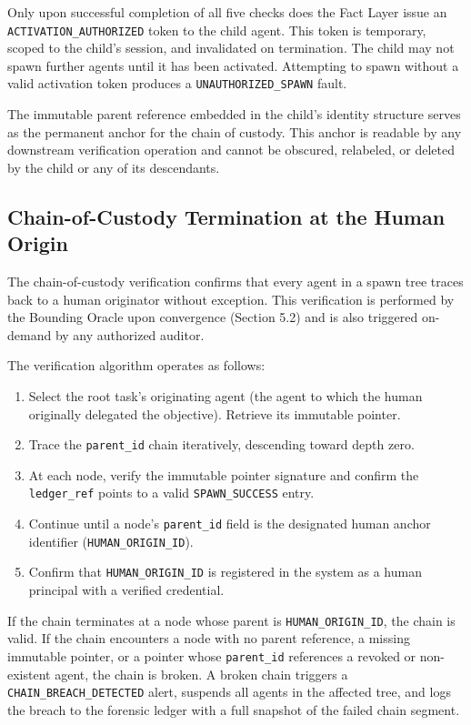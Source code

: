 Only upon successful completion of all five checks does the Fact Layer issue an \texttt{ACTIVATION\_AUTHORIZED} token to the child agent. This token is temporary, scoped to the child's session, and invalidated on termination. The child may not spawn further agents until it has been activated. Attempting to spawn without a valid activation token produces a \texttt{UNAUTHORIZED\_SPAWN} fault.

The immutable parent reference embedded in the child's identity structure serves as the permanent anchor for the chain of custody. This anchor is readable by any downstream verification operation and cannot be obscured, relabeled, or deleted by the child or any of its descendants.

\subsection{Chain-of-Custody Termination at the Human Origin}

The chain-of-custody verification confirms that every agent in a spawn tree traces back to a human originator without exception. This verification is performed by the Bounding Oracle upon convergence (Section 5.2) and is also triggered on-demand by any authorized auditor.

The verification algorithm operates as follows:

\begin{enumerate}
    \item Select the root task's originating agent (the agent to which the human originally delegated the objective). Retrieve its immutable pointer.
    \item Trace the \texttt{parent\_id} chain iteratively, descending toward depth zero.
    \item At each node, verify the immutable pointer signature and confirm the \texttt{ledger\_ref} points to a valid \texttt{SPAWN\_SUCCESS} entry.
    \item Continue until a node's \texttt{parent\_id} field is the designated human anchor identifier (\texttt{HUMAN\_ORIGIN\_ID}).
    \item Confirm that \texttt{HUMAN\_ORIGIN\_ID} is registered in the system as a human principal with a verified credential.
\end{enumerate}

If the chain terminates at a node whose parent is \texttt{HUMAN\_ORIGIN\_ID}, the chain is valid. If the chain encounters a node with no parent reference, a missing immutable pointer, or a pointer whose \texttt{parent\_id} references a revoked or non-existent agent, the chain is broken. A broken chain triggers a \texttt{CHAIN\_BREACH\_DETECTED} alert, suspends all agents in the affected tree, and logs the breach to the forensic ledger with a full snapshot of the failed chain segment.


